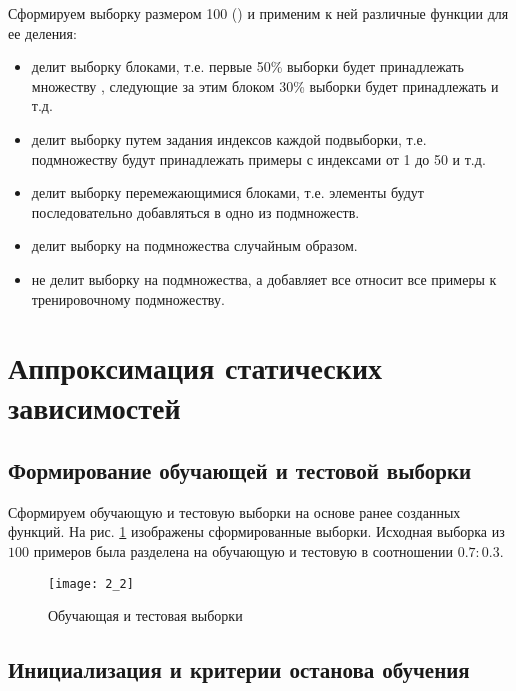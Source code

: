 Сформируем выборку размером 100 () и применим к ней различные функции для ее деления:
\begin{itemize}
	\item {} делит выборку блоками, т.е. первые 50\% выборки будет принадлежать множеству , следующие за этим блоком 30\% выборки будет принадлежать  и т.д.
	\item {} делит выборку путем задания индексов каждой подвыборки, т.е. подмножеству  будут принадлежать примеры с индексами от 1 до 50 и т.д.
	\item {} делит выборку перемежающимися блоками, т.е. элементы будут последовательно добавляться в одно из подмножеств.
	\item {} делит выборку на подмножества случайным образом.
	\item {} не делит выборку на подмножества, а добавляет все относит все примеры к тренировочному подмножеству.
\end{itemize}

\section{Аппроксимация статических зависимостей}

\subsection{Формирование обучающей и тестовой выборки}

Сформируем обучающую и тестовую выборки на основе ранее созданных функций. На рис. \ref{fig:2_2} изображены сформированные выборки. Исходная выборка из $100$ примеров была разделена на обучающую и тестовую в соотношении $0.7 : 0.3$.
\vspace{-0.5cm}
\begin{figure}[H]
\begin{center}
	\texttt{[image: 2\_2]}
	\caption{Обучающая и тестовая выборки}
	\label{fig:2_2}
\end{center}
\end{figure}
\vspace{-1.5cm}

\subsection{Инициализация и критерии останова обучения}

